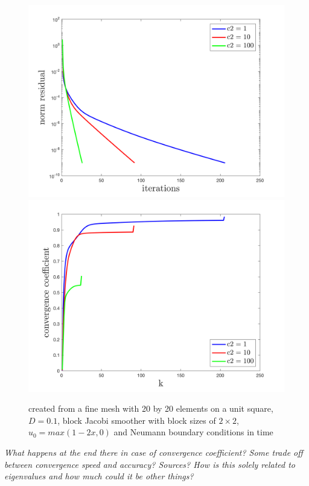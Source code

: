 \documentclass[../draft_1.tex]{subfiles}
\begin{document}
\begin{figure}[h!]
	\centering
	\includegraphics[scale=0.4]{images/implementation/c2_comparison/res_norm}
	\includegraphics[scale=0.4]{images/implementation/c2_comparison/conv_rate}
	\caption{created from a fine mesh with 20 by 20 elements on a unit square, $D = 0.1$, block Jacobi smoother with block sizes of $2 \times 2$, $u_0 = max(1-2x, 0)$ and Neumann boundary conditions in time}
\end{figure}

\textit{What happens at the end there in case of convergence coefficient? Some trade off between convergence speed and accuracy? Sources? How is this solely related to eigenvalues and how much could it be other things?}
\end{document}
